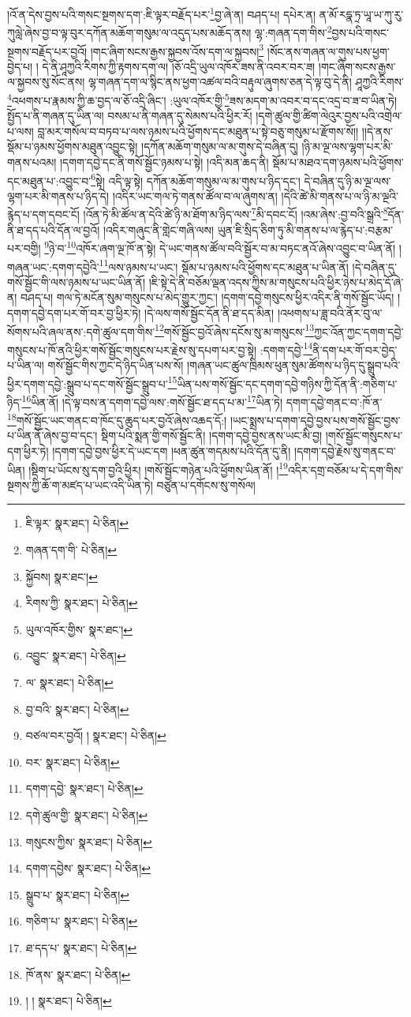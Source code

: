 །འོ་ན་དེས་བྱས་པའི་གསང་སྔགས་དག་:ཇི་ལྟར་བརྗོད་པར་\footnote{ཇི་ལྟར་  སྣར་ཐང་།  པེ་ཅིན། }བྱ་ཞེ་ན། བཤད་པ། དཔེར་ན། ན་མོ་རདྣ་ཏྲ་ཡཱ་ཡ་ཀུ་རུ་ཀུལླེ་ཞེས་བྱ་བ་ལྟ་བུར་དཀོན་མཆོག་གསུམ་ལ་འདུད་པས་མཆོད་ནས། ལྷ་:གཞན་དག་གིས་\footnote{གཞན་དག་གི་  པེ་ཅིན། }བྱས་པའི་གསང་སྔགས་བརྗོད་པར་བྱའོ། །གང་ཞིག་སངས་རྒྱས་སྐྱབས་འོས་དག་ལ་སྐྱབས།\footnote{སྐྱོབས།  སྣར་ཐང་། } །སོང་ནས་གཞན་ལ་གུས་པས་ཕྱག་བྱེད་པ། །
དེ་ནི་ཤཱཀྱའི་རིགས་ཀྱི་རྟགས་དག་ལ། །ཅོ་འདྲི་ཡུལ་འཁོར་ཟས་ནི་འབར་བར་ཟ། །གང་ཞིག་སངས་རྒྱས་ལ་སྐྱབས་སུ་སོང་ནས། ལྷ་གཞན་དག་ལ་སྙིང་ནས་ཕྱག་འཚལ་བའི་བརྟུལ་ཞུགས་ཅན་དེ་ལྟ་བུ་དེ་ནི། ཤཱཀྱའི་རིགས་\footnote{རིགས་ཀྱི་  སྣར་ཐང་།  པེ་ཅིན། }འཕགས་པ་རྣམས་ཀྱི་ཆ་བྱད་ལ་ཅོ་འདྲི་ཞིང་། :ཡུལ་འཁོར་གྱི་\footnote{ཡུལ་འཁོར་གྱིས་  སྣར་ཐང་། }ཟས་མདག་མ་འབར་བ་དང་འདྲ་བ་ཟ་བ་ཡིན་ཏེ། སྤྱོད་པ་ནི་གཞན་དུ་ཡིན་ལ། བསམ་པ་ནི་གཞན་དུ་སེམས་པའི་ཕྱིར་རོ། །དགེ་ཚུལ་གྱི་ཚིག་ལེའུར་བྱས་པའི་འགྲེལ་པ་ལས། བླ་མར་གསོལ་བ་བཏབ་པ་ལས་ཉམས་པའི་ཕྱོགས་དང་མཐུན་པ་སྟེ་བཅུ་གསུམ་པ་རྫོགས་སོ།། །།དེ་ནས་སྡོམ་པ་ཉམས་ཕྱོགས་མཐུན་འབྱུང་སྟེ། །དཀོན་མཆོག་གསུམ་ལ་མ་གུས་དེ་བཞིན་དུ། །ཉི་མ་ལྔ་ལས་ལྷག་པར་མི་གནས་པའམ། །དགག་དབྱེ་དང་ནི་གསོ་སྦྱོང་ཉམས་པ་སྟེ། །འདི་མན་ཆད་ནི། སྡོམ་པ་མཐའ་དག་ཉམས་པའི་ཕྱོགས་དང་མཐུན་པ་:འབྱུང་བ་\footnote{འབྱུང་  སྣར་ཐང་།  པེ་ཅིན། }སྟེ། འདི་ལྟ་སྟེ། དཀོན་མཆོག་གསུམ་ལ་མ་གུས་པ་ཉིད་དང་། དེ་བཞིན་དུ་ཉི་མ་ལྔ་ལས་ལྷག་པར་མི་གནས་པ་ཉིད་དེ། །འདིར་ཡང་གལ་ཏེ་གནས་ཚོལ་བ་ལ་ཞུགས་ན། །དེའི་ཚེ་མི་གནས་པ་ལ་ཉི་མ་ལྔའི་རྙེད་པ་དག་དབང་ངོ། །འོན་ཏེ་མི་ཚོལ་ན་དེའི་ཚེ་ཉི་མ་ཐོག་མ་ཉིད་ལས་\footnote{ལ་  སྣར་ཐང་།  པེ་ཅིན། }མི་དབང་ངོ། །འམ་ཞེས་:བྱ་བའི་སྒྲའི་\footnote{བྱ་བའི་  སྣར་ཐང་།  པེ་ཅིན། }དོན་ནི་ཐ་དད་པའི་དོན་ལ་བྱའོ། །འདིར་གཞུང་ནི་གླེང་གཞི་ལས། ཡུན་ཇི་སྲིད་ཅིག་ཏུ་མི་གནས་པ་ལ་རྙེད་པ་:བརྩམ་པར་བགྱི། \footnote{བཙལ་བར་བྱའོ། །  སྣར་ཐང་།  པེ་ཅིན། }ཉེ་བ་\footnote{བར་  སྣར་ཐང་།  པེ་ཅིན། }འཁོར་ཞག་ལྔ་ཁོ་ན་སྟེ། དེ་ཡང་གནས་ཚོལ་བའི་སྦྱོར་བ་མ་བཏང་ནའོ་ཞེས་འབྱུང་བ་ཡིན་ནོ། །གཞན་ཡང་:དགག་དབྱེའི་\footnote{དགག་དབྱེ་  སྣར་ཐང་།  པེ་ཅིན། }ལས་ཉམས་པ་ཡང་། སྡོམ་པ་ཉམས་པའི་ཕྱོགས་དང་མཐུན་པ་ཡིན་ནོ། །དེ་བཞིན་དུ་གསོ་སྦྱོང་གི་ལས་ཉམས་པ་ཡང་ཡིན་ནོ། །ཇི་སྟེ་དེ་ནི་བཅོམ་ལྡན་འདས་ཀྱིས་མ་གསུངས་པའི་ཕྱིར་ཉེས་པ་མེད་དོ་ཞེ་ན། བཤད་པ། གལ་ཏེ་མངོན་སུམ་གསུངས་པ་མེད་གྱུར་ཀྱང་། །དགག་དབྱེ་གསུངས་ཕྱིར་འདིར་ནི་གསོ་སྦྱོང་ཡོད། །དགག་དབྱེ་དག་པར་གོ་བར་བྱ་ཕྱིར་ཏེ། །དེ་ལས་གསོ་སྦྱོང་དོན་ནི་ཐ་དད་མིན། །འཕགས་པ་ཟླ་བའི་ནོར་བུ་ལ་སོགས་པའི་ཞལ་ནས་:དགེ་ཚུལ་དག་གིས་\footnote{དགེ་ཚུལ་གྱི་  སྣར་ཐང་།  པེ་ཅིན། }གསོ་སྦྱོང་བྱའོ་ཞེས་དངོས་སུ་མ་གསུངས་\footnote{གསུངས་ཀྱིས་  སྣར་ཐང་།  པེ་ཅིན། }ཀྱང་འོན་ཀྱང་དགག་དབྱེ་གསུངས་པ་ཁོ་ནའི་ཕྱིར་གསོ་སྦྱོང་གསུངས་པར་རྗེས་སུ་དཔག་པར་བྱ་སྟེ། :དགག་དབྱེ་\footnote{དགག་དབྱེས་  སྣར་ཐང་།  པེ་ཅིན། }ནི་དག་པར་གོ་བར་བྱེད་པ་ཡིན་ལ། གསོ་སྦྱོང་གིས་ཀྱང་དེ་ཉིད་ཡིན་པས་སོ། །གཞན་ཡང་ཚུལ་ཁྲིམས་ཕུན་སུམ་ཚོགས་པ་ཉིད་དུ་སྒྲུབ་པའི་ཕྱིར་དགག་དབྱེ་:སྒྲུབ་པ་དང་གསོ་སྦྱོང་སྒྲུབ་པ་\footnote{སྒྲུབ་པ་  སྣར་ཐང་།  པེ་ཅིན། }ཡིན་པས་གསོ་སྦྱོང་དང་དགག་དབྱེ་གཉིས་ཀྱི་དོན་ནི་:གཅིག་པ་ཉིད་\footnote{གཅིག་པ་  སྣར་ཐང་།  པེ་ཅིན། }ཡིན་ནོ། །དེ་ལྟ་བས་ན་དགག་དབྱེ་ལས་:གསོ་སྦྱོང་ཐ་དད་པ་མ་\footnote{ཐ་དད་པ་  སྣར་ཐང་།  པེ་ཅིན། }ཡིན་ཏེ། དགག་དབྱེ་གནང་བ་:ཁོ་ན་\footnote{ཁོ་ནས་  སྣར་ཐང་།  པེ་ཅིན། }གསོ་སྦྱོང་ཡང་གནང་བ་ཁོང་དུ་ཆུད་པར་བྱའོ་ཞེས་འཆད་དོ:། །ཡང་སྨྲས་པ་དགག་དབྱེ་བྱས་པས་གསོ་སྦྱོང་བྱས་པ་ཡིན་ནོ་ཞེས་བྱ་བ་དང་། སྡིག་པའི་སྨན་གྱི་གསོ་སྦྱོང་ནི། །དགག་དབྱེ་བྱས་ནས་ཡང་མི་བྱ། །གསོ་སྦྱོང་གསུངས་པ་དག་ཕྱིར་ཏེ། །དགག་དབྱེ་བྱས་ཕྱིར་དེ་ཡང་དག །ཕན་ཚུན་གདམས་པའི་དོན་དུ་ནི། །དགག་དབྱེ་རྗེས་སུ་གནང་བ་ཡིན། །སྡིག་པ་ཡོངས་སུ་དག་བྱའི་ཕྱིར། །གསོ་སྦྱོང་གཉེན་པའི་ཕྱོགས་ཡིན་ནོ། །\footnote{། །  སྣར་ཐང་།  པེ་ཅིན། }འདིར་དགྲ་བཅོམ་པ་དེ་དག་གིས་སྔགས་ཀྱི་ཆོ་ག་མཛད་པ་ཡང་འདི་ཡིན་ཏེ། བཙུན་པ་དགོངས་སུ་གསོལ། 